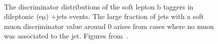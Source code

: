 \begin{figure}
\begin{centering}
 \\
\caption[The soft lepton b discriminator distributions]{The discriminator distributions of the soft lepton b taggers in dileptonic ($\mathrm{e\mu}$) \ttbar+jets events. The large fraction of jets with a soft muon discriminator value around 0 arises from cases where no muon was associated to the jet. Figures from~\cite{CMS-PAS-BTV-15-001}.}
\label{fig:btag_softlep}
\end{centering}
\end{figure}

